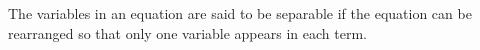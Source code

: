 The variables in an equation are said to be separable
if the equation can be rearranged so that only one 
variable appears in each term.